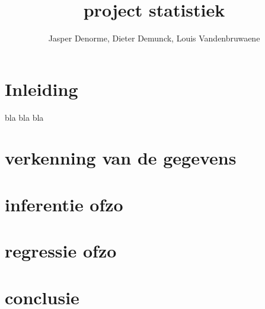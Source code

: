 \documentclass[]{article}
\title{project statistiek}
\author{Jasper Denorme, Dieter Demunck, Louis Vandenbruwaene}
\begin{document}
\maketitle



\section{Inleiding}
bla bla bla
\section{verkenning van de gegevens}
\section{inferentie ofzo}
\section{regressie ofzo}
\section{conclusie}
\end{document}
